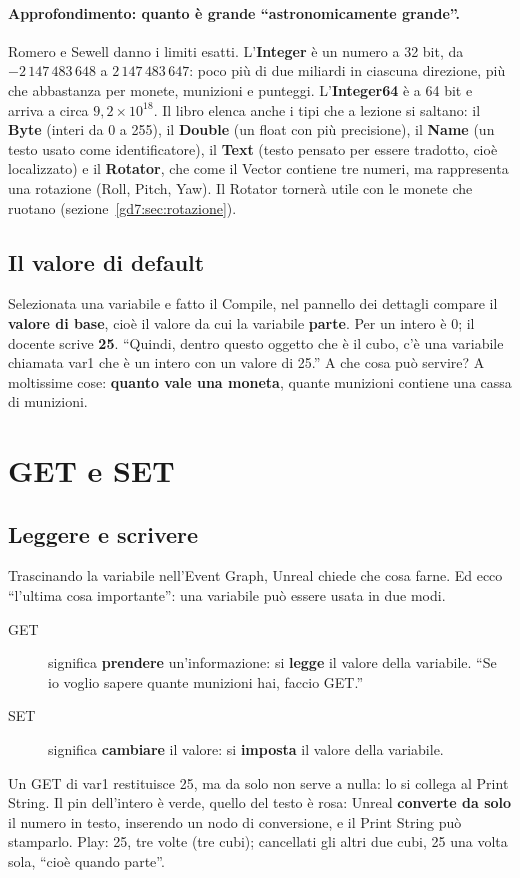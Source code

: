 \paragraph{Approfondimento: quanto è grande ``astronomicamente grande''.}
Romero e Sewell danno i limiti esatti. L'\textbf{Integer} è un numero a 32
bit, da $-2\,147\,483\,648$ a $2\,147\,483\,647$: poco più di due miliardi in
ciascuna direzione, più che abbastanza per monete, munizioni e punteggi.
L'\textbf{Integer64} è a 64 bit e arriva a circa $9{,}2 \times 10^{18}$. Il
libro elenca anche i tipi che a lezione si saltano: il \textbf{Byte} (interi
da 0 a 255), il \textbf{Double} (un float con più precisione), il
\textbf{Name} (un testo usato come identificatore), il \textbf{Text} (testo
pensato per essere tradotto, cioè localizzato) e il \textbf{Rotator}, che come
il Vector contiene tre numeri, ma rappresenta una rotazione (Roll, Pitch,
Yaw). Il Rotator tornerà utile con le monete che ruotano
(sezione~\ref{gd7:sec:rotazione}).

\subsection{Il valore di default}

Selezionata una variabile e fatto il Compile, nel pannello dei dettagli
compare il \textbf{valore di base}, cioè il valore da cui la variabile
\textbf{parte}. Per un intero è 0; il docente scrive \textbf{25}. ``Quindi,
dentro questo oggetto che è il cubo, c'è una variabile chiamata var1 che è un
intero con un valore di 25.'' A che cosa può servire? A moltissime cose:
\textbf{quanto vale una moneta}, quante munizioni contiene una cassa di
munizioni.

\section{GET e SET}
\label{gd7:sec:get-set}

\subsection{Leggere e scrivere}

Trascinando la variabile nell'Event Graph, Unreal chiede che cosa farne. Ed
ecco ``l'ultima cosa importante'': una variabile può essere usata in due
modi.
\begin{description}
  \item[GET] significa \textbf{prendere} un'informazione: si \textbf{legge}
        il valore della variabile. ``Se io voglio sapere quante munizioni
        hai, faccio GET.''
  \item[SET] significa \textbf{cambiare} il valore: si \textbf{imposta} il
        valore della variabile.
\end{description}
Un GET di var1 restituisce 25, ma da solo non serve a nulla: lo si collega al
Print String. Il pin dell'intero è verde, quello del testo è rosa: Unreal
\textbf{converte da solo} il numero in testo, inserendo un nodo di conversione,
e il Print String può stamparlo. Play: 25, tre volte (tre cubi); cancellati gli
altri due cubi, 25 una volta sola, ``cioè quando parte''.

